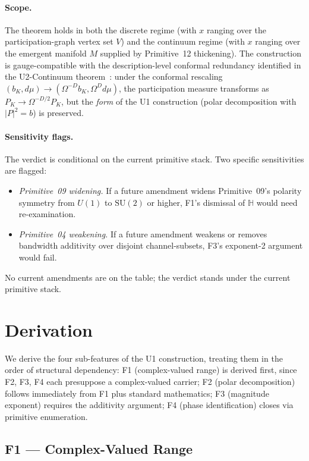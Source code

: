 \documentclass[11pt,a4paper]{article}
\begin{document}
\paragraph{Scope.} The theorem holds in both the discrete regime (with $x$ ranging over the participation-graph vertex set $V$) and the continuum regime (with $x$ ranging over the emergent manifold $M$ supplied by Primitive~12 thickening). The construction is gauge-compatible with the description-level conformal redundancy identified in the U2-Continuum theorem~\cite{u2}: under the conformal rescaling $(b_K, d\mu) \to (\Omega^{-D} b_K, \Omega^D d\mu)$, the participation measure transforms as $P_K \to \Omega^{-D/2} P_K$, but the \emph{form} of the U1 construction (polar decomposition with $|P|^2 = b$) is preserved.

\paragraph{Sensitivity flags.} The verdict is conditional on the current primitive stack. Two specific sensitivities are flagged:
\begin{itemize}
  \item \emph{Primitive~09 widening.} If a future amendment widens Primitive~09's polarity symmetry from $U(1)$ to $\mathrm{SU}(2)$ or higher, F1's dismissal of $\mathbb{H}$ would need re-examination.
  \item \emph{Primitive~04 weakening.} If a future amendment weakens or removes bandwidth additivity over disjoint channel-subsets, F3's exponent-2 argument would fail.
\end{itemize}
No current amendments are on the table; the verdict stands under the current primitive stack.

\section{Derivation}\label{sec:derivation}

We derive the four sub-features of the U1 construction, treating them in the order of structural dependency: F1 (complex-valued range) is derived first, since F2, F3, F4 each presuppose a complex-valued carrier; F2 (polar decomposition) follows immediately from F1 plus standard mathematics; F3 (magnitude exponent) requires the additivity argument; F4 (phase identification) closes via primitive enumeration.

\subsection{F1 --- Complex-Valued Range}\label{sec:F1}
\end{document}
